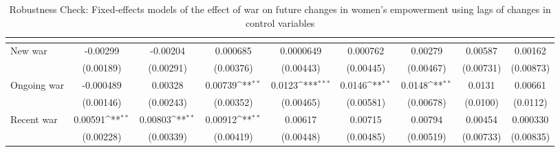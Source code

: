 \begin{table}[htbp]\centering
\def\sym#1{\ifmmode^{#1}\else\(^{#1}\)\fi}
\caption{Robustness Check: Fixed-effects models of the effect of war on future changes in women's empowerment using lags of changes in control variables\label{polemprobustls}}
\begin{tabular}{l*{8}{c}}
\hline\hline
                    &&&&&&&&\\
\hline
New war              &    -0.00299         &    -0.00204         &    0.000685         &   0.0000649         &    0.000762         &     0.00279         &     0.00587         &     0.00162         \\
                    &   (0.00189)         &   (0.00291)         &   (0.00376)         &   (0.00443)         &   (0.00445)         &   (0.00467)         &   (0.00731)         &   (0.00873)         \\
[1em]
Ongoing war          &   -0.000489         &     0.00328         &     0.00739\sym{**} &      0.0123\sym{***}&      0.0146\sym{**} &      0.0148\sym{**} &      0.0131         &     0.00661         \\
                    &   (0.00146)         &   (0.00243)         &   (0.00352)         &   (0.00465)         &   (0.00581)         &   (0.00678)         &    (0.0100)         &    (0.0112)         \\
[1em]
Recent war            &     0.00591\sym{**} &     0.00803\sym{**} &     0.00912\sym{**} &     0.00617         &     0.00715         &     0.00794         &     0.00454         &    0.000330         \\
                    &   (0.00228)         &   (0.00339)         &   (0.00419)         &   (0.00448)         &   (0.00485)         &   (0.00519)         &   (0.00733)         &   (0.00835)         \\

\end{tabular}
\end{table}
